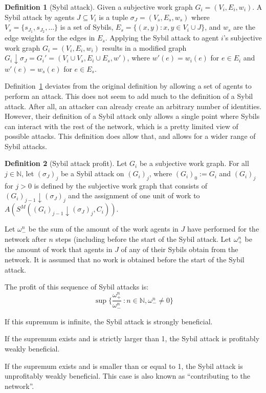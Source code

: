 \documentclass[a4paper,11pt]{book}
\newcommand{\bb}{\mathbb}
\theoremstyle{definition}
\newtheorem{definition}{Definition}
\begin{document}
\begin{definition}[Sybil attack]
    Given a subjective work graph $G_i = (V_i, E_i, w_i)$.
    A Sybil attack by agents $J \subseteq V_i$ is a tuple $\sigma_J = (V_s, E_s, w_s)$
    where $V_s = \{ s_{J_1}, s_{J_2}, \ldots\}$ is a set of Sybils, 
    $E_s = \{(x, y) : x, y \in V_i \cup J\}$, and $w_s$ are the edge weights for
    the edges in $E_s$. Applying the Sybil attack to agent $i$'s subjective work graph
    $G_i = (V_i, E_i, w_i)$ results in a modified graph 
    $G_i \downarrow \sigma_J = G_i' = (V_i \cup V_s, E_i \cup E_s, w')$, where
    $w'(e) = w_i(e)$ for $e \in E_i$ and $w'(e) = w_s(e)$ for $e \in E_s$.
    \label{def:collSybil}
\end{definition}

Definition~\ref{def:collSybil} deviates from the original definition by
allowing a set of agents to perform an attack. This does not seem to add much to the definition of a Sybil attack.
After all, an attacker can already create an arbitrary number of identities. However, their definition of a
Sybil attack only allows a single point where Sybils can interact with the rest of the network, which is a pretty limited
view of possible attacks. This definition does allow that, and allows for a wider range of Sybil attacks. 

\begin{definition}[Sybil attack profit]
    Let $G_i$ be a subjective work graph. For all $j \in \bb{N}$, let $(\sigma_J)_j$ be a Sybil attack
    on $(G_i)_j$, where $(G_i)_0 := G_i$ and $(G_i)_j$ for $j > 0$ is defined by the subjective
    work graph that consists of $(G_i)_{j-1} \downarrow (\sigma_J)_j$ and the assignment of one unit of work to 
    $A(S^M( (G_i)_{j-1} \downarrow (\sigma_J)_j, C_i))$.

    Let $\omega^n_-$ be the sum of the amount of the work agents in $J$ have performed for
    the network after $n$ steps (including before the start of the Sybil attack.
    Let $\omega^n_+$ be the amount of work that agents in $J$ of any of their
    Sybils obtain from the network. It is assumed that no work is obtained before the start of the
    Sybil attack.

    The profit of this sequence of Sybil attacks is:
    \begin{equation*}
        \sup \{\frac{\omega^n_+}{\omega^n_-}\ : n \in \bb{N}, \omega^n_- \neq 0\}
    \end{equation*}

    If this supremum is infinite, the Sybil attack is strongly beneficial.

    If the supremum exists and is strictly larger than 1, the Sybil attack is 
    profitably weakly beneficial.

    If the supremum exists and is smaller than or equal to 1, the Sybil attack
    is unprofitably weakly beneficial. This case is also known as ``contributing to the network''.
    \label{def:Sybil_profit}
\end{definition}
\end{document}
